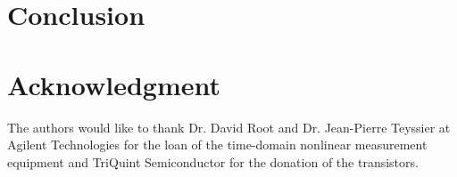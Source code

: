 \section{Conclusion}


\section*{Acknowledgment}


The authors would like to thank Dr. David Root and Dr. Jean-Pierre Teyssier at Agilent Technologies for the loan of the time-domain nonlinear measurement equipment and TriQuint Semiconductor for the donation of the transistors. 




%




